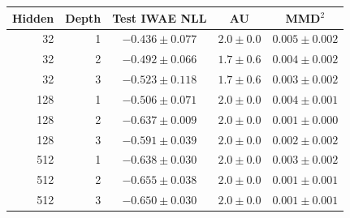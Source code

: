\begin{tabular}{rrccc}
\toprule
Hidden & Depth & Test IWAE NLL & AU & MMD$^2$ \\
\midrule
32 & 1 & $-0.436\pm0.077$ & $2.0\pm0.0$ & $0.005\pm0.002$ \\
32 & 2 & $-0.492\pm0.066$ & $1.7\pm0.6$ & $0.004\pm0.002$ \\
32 & 3 & $-0.523\pm0.118$ & $1.7\pm0.6$ & $0.003\pm0.002$ \\
\midrule
128 & 1 & $-0.506\pm0.071$ & $2.0\pm0.0$ & $0.004\pm0.001$ \\
128 & 2 & $-0.637\pm0.009$ & $2.0\pm0.0$ & $0.001\pm0.000$ \\
128 & 3 & $-0.591\pm0.039$ & $2.0\pm0.0$ & $0.002\pm0.002$ \\
\midrule
512 & 1 & $-0.638\pm0.030$ & $2.0\pm0.0$ & $0.003\pm0.002$ \\
512 & 2 & $-0.655\pm0.038$ & $2.0\pm0.0$ & $0.001\pm0.001$ \\
512 & 3 & $-0.650\pm0.030$ & $2.0\pm0.0$ & $0.001\pm0.001$ \\
\bottomrule
\end{tabular}

